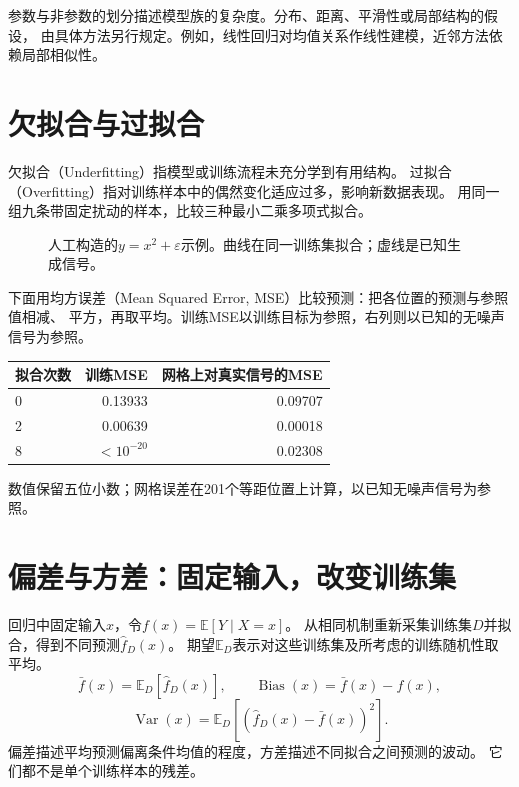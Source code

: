 参数与非参数的划分描述模型族的复杂度。分布、距离、平滑性或局部结构的假设，
由具体方法另行规定。例如，线性回归对均值关系作线性建模，近邻方法依赖局部相似性。

\section{欠拟合与过拟合}
\label{sec:learn-fit}
欠拟合（Underfitting）指模型或训练流程未充分学到有用结构。
过拟合（Overfitting）指对训练样本中的偶然变化适应过多，影响新数据表现。
用同一组九条带固定扰动的样本，比较三种最小二乘多项式拟合。

\begin{figure}[htbp]
\centering
\caption{人工构造的$y=x^2+\varepsilon$示例。曲线在同一训练集拟合；虚线是已知生成信号。}
\par\smallskip
{}
\end{figure}

下面用均方误差（Mean Squared Error, MSE）比较预测：把各位置的预测与参照值相减、
平方，再取平均。训练MSE以训练目标为参照，右列则以已知的无噪声信号为参照。

\begin{center}
\small
\begin{tabular}{lrr}
\toprule
拟合次数 & 训练MSE & 网格上对真实信号的MSE\\
\midrule
0 & 0.13933 & 0.09707\\
2 & 0.00639 & 0.00018\\
8 & $<10^{-20}$ & 0.02308\\
\bottomrule
\end{tabular}
\end{center}
数值保留五位小数；网格误差在201个等距位置上计算，以已知无噪声信号为参照。

\section{偏差与方差：固定输入，改变训练集}
\label{sec:learn-biasvariance}
回归中固定输入$x$，令$f(x)=\mathbb E[Y\mid X=x]$。
从相同机制重新采集训练集$D$并拟合，得到不同预测$\hat f_D(x)$。
期望$\mathbb E_D$表示对这些训练集及所考虑的训练随机性取平均。
\[
 \bar f(x)=\mathbb E_D[\hat f_D(x)],\qquad
 \operatorname{Bias}(x)=\bar f(x)-f(x),
\]
\[
 \operatorname{Var}(x)=\mathbb E_D[(\hat f_D(x)-\bar f(x))^2].
\]
偏差描述平均预测偏离条件均值的程度，方差描述不同拟合之间预测的波动。
它们都不是单个训练样本的残差。

